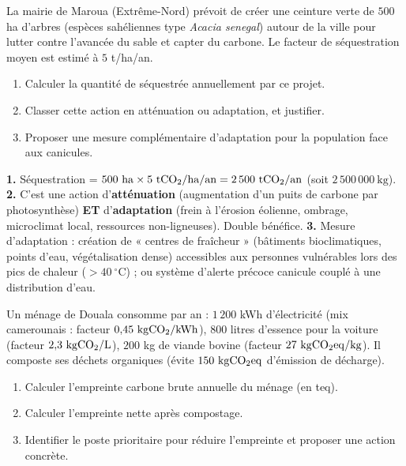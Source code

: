 \documentclass[11pt]{article}
\begin{document}
\begin{exercice}
La mairie de Maroua (Extrême-Nord) prévoit de créer une ceinture verte de $500$ ha d'arbres (espèces sahéliennes type \emph{Acacia senegal}) autour de la ville pour lutter contre l'avancée du sable et capter du carbone. Le facteur de séquestration moyen est estimé à $5$ t/ha/an.
\begin{enumerate}
\item Calculer la quantité de  séquestrée annuellement par ce projet.
\item Classer cette action en atténuation ou adaptation, et justifier.
\item Proposer une mesure complémentaire d'adaptation pour la population face aux canicules.
\end{enumerate}
\end{exercice}

\begin{corrige}[Exercice 2]
\textbf{1.} Séquestration = $500\ \mathrm{ha} \times 5\ \mathrm{t\ce{CO2}/ha/an} = 2\,500\ \mathrm{t\ce{CO2}/an}$ (soit $2\,500\,000\ \mathrm{kg}$).
\textbf{2.} C'est une action d'\textbf{atténuation} (augmentation d'un puits de carbone par photosynthèse) \textbf{ET} d'\textbf{adaptation} (frein à l'érosion éolienne, ombrage, microclimat local, ressources non-ligneuses). Double bénéfice.
\textbf{3.} Mesure d'adaptation : création de « centres de fraîcheur » (bâtiments bioclimatiques, points d'eau, végétalisation dense) accessibles aux personnes vulnérables lors des pics de chaleur ($>40\ ^\circ\mathrm{C}$) ; ou système d'alerte précoce canicule couplé à une distribution d'eau.
\end{corrige}

\begin{exercice}
Un ménage de Douala consomme par an : $1\,200$ kWh d'électricité (mix camerounais : facteur $0{,}45\ \mathrm{kg\ce{CO2}/kWh}$), $800$ litres d'essence pour la voiture (facteur $2{,}3\ \mathrm{kg\ce{CO2}/L}$), $200$ kg de viande bovine (facteur $27\ \mathrm{kg\ce{CO2}eq/kg}$). Il composte ses déchets organiques (évite $150\ \mathrm{kg\ce{CO2}eq}$ d'émission de décharge).
\begin{enumerate}
\item Calculer l'empreinte carbone brute annuelle du ménage (en teq).
\item Calculer l'empreinte nette après compostage.
\item Identifier le poste prioritaire pour réduire l'empreinte et proposer une action concrète.
\end{enumerate}
\end{exercice}
\end{document}
